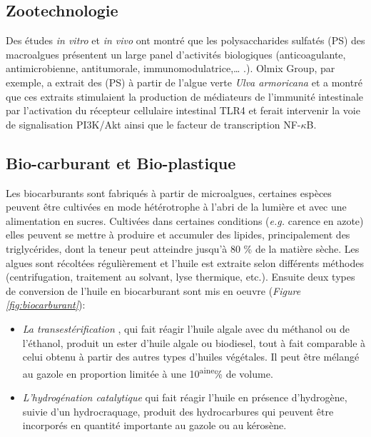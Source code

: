 \documentclass[
]{book}
\providecommand{\tightlist}{%
  \setlength{\itemsep}{0pt}\setlength{\parskip}{0pt}}
\begin{document}
\hypertarget{zootechnologie}{%
\subsection{Zootechnologie}\label{zootechnologie}}

Des études \emph{in vitro} et \emph{in vivo} ont montré que les polysaccharides sulfatés (PS) des macroalgues présentent un large panel d'activités biologiques (anticoagulante, antimicrobienne, antitumorale, immunomodulatrice,\ldots{} .).
Olmix Group, par exemple, a extrait des (PS) à partir de l'algue verte \emph{Ulva armoricana} et a montré que ces extraits stimulaient la production de médiateurs de l'immunité intestinale par l'activation du récepteur cellulaire intestinal TLR4 et ferait intervenir la voie de signalisation PI3K/Akt ainsi que le facteur de transcription NF-\(\kappa\)B.\citep[\citet{berri2017}]{berri2016}

\hypertarget{bio-carburant-et-bio-plastique}{%
\subsection{Bio-carburant et Bio-plastique}\label{bio-carburant-et-bio-plastique}}

Les biocarburants sont fabriqués à partir de microalgues, certaines espèces peuvent être cultivées en mode hétérotrophe à l'abri de la lumière et avec une alimentation en sucres. Cultivées dans certaines conditions (\emph{e.g.} carence en azote) elles peuvent se mettre à produire et accumuler des lipides, principalement des triglycérides, dont la teneur peut atteindre jusqu'à 80 \% de la matière sèche.
Les algues sont récoltées régulièrement et l'huile est extraite selon différents méthodes (centrifugation, traitement au solvant, lyse thermique, etc.). Ensuite deux types de conversion de l'huile en biocarburant sont mis en oeuvre (\emph{Figure \ref{fig:biocarburant}}):

\begin{itemize}
\tightlist
\item
  \emph{La transestérification} , qui fait réagir l'huile algale avec du méthanol ou de l'éthanol, produit un ester d'huile algale ou biodiesel, tout à fait comparable à celui obtenu à partir des autres types d'huiles végétales. Il peut être mélangé au gazole en proportion limitée à une 10\textsuperscript{aine}\% de volume.
\item
  \emph{L'hydrogénation catalytique} qui fait réagir l'huile en présence d'hydrogène, suivie d'un hydrocraquage, produit des hydrocarbures qui peuvent être incorporés en quantité importante au gazole ou au kérosène.
\end{itemize}
\end{document}
